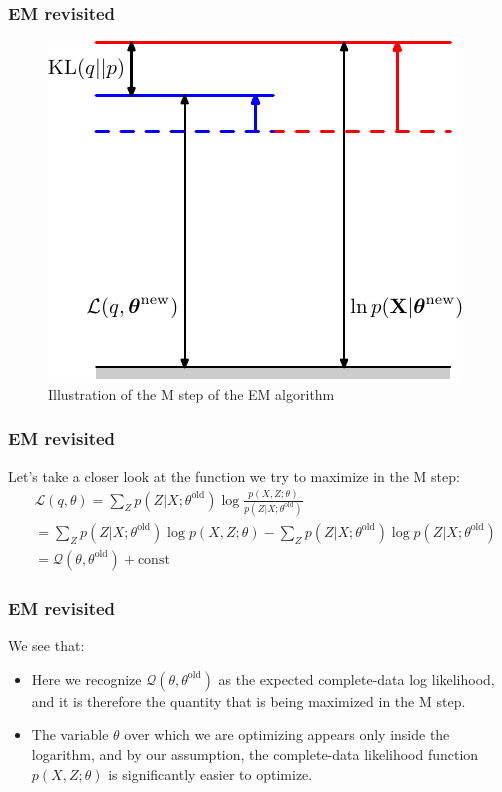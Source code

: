 \documentclass{beamer}
\begin{document}
\begin{frame}
    \frametitle{EM revisited}
    \begin{figure}
        \caption{Illustration of the M step of the EM algorithm}
        \includegraphics{Figure_15.pdf}
    \end{figure}
\end{frame}

\begin{frame}
    \frametitle{EM revisited}
    Let's take a closer look at the function we try to maximize in the M step:
    \begin{align*}
        &\mathcal{L}(q,\theta)=\sum_{Z}p(Z|X;\theta^{\textrm{old}})\log\frac{p(X,Z;\theta)}{p(Z|X;\theta^{\textrm{old}})} \\
        &=\sum_{Z}p(Z|X;\theta^{\textrm{old}})\log{}p(X,Z;\theta)-\sum_{Z}p(Z|X;\theta^{\textrm{old}})\log{}p(Z|X;\theta^{\textrm{old}}) \\
        &=\mathcal{Q}(\theta,\theta^{\textrm{old}})+\textrm{const}
    \end{align*}
\end{frame}

\begin{frame}
    \frametitle{EM revisited}
    We see that:
    \begin{itemize}
        \item Here we recognize $\mathcal{Q}(\theta,\theta^{\textrm{old}})$ as the expected complete-data log likelihood, and it is therefore the quantity that is being maximized in the M step.
        \item The variable $\theta$ over which we are optimizing appears only inside the logarithm, and by our assumption, the complete-data likelihood function $p(X,Z;\theta)$ is significantly easier to optimize.
    \end{itemize}
\end{frame}
\end{document}
